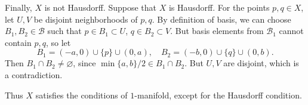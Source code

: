 \documentclass[a4paper,11pt]{article}
\newcommand{\B}{\mathcal{B}}
\begin{document}
\begin{minipage}[t][270mm]{90mm}
    Finally, \(X\) is not Hausdorff. Suppose that \(X\) is Hausdorff. For the points \(p, q \in X\), let \(U, V\) be disjoint neighborhoods of \(p, q\). By definition of basis, we can choose \(B_1, B_2 \in \B\) such that \(p \in B_1 \subset U\), \(q \in B_2 \subset V\). But basis elements from \(\B_1\) cannot contain \(p, q\), so let
    \[
        B_1 = (-a, 0) \cup \{p\} \cup (0, a), \quad B_2 = (-b, 0) \cup \{q\} \cup (0, b).
    \]
    Then \(B_1 \cap B_2 \neq \varnothing\), since \(\min\{a, b\} / 2 \in B_1 \cap B_2\). But \(U, V\) are disjoint, which is a contradiction.

    Thus \(X\) satisfies the conditions of \(1\)-manifold, except for the Hausdorff condition.

\end{minipage}
\end{document}
